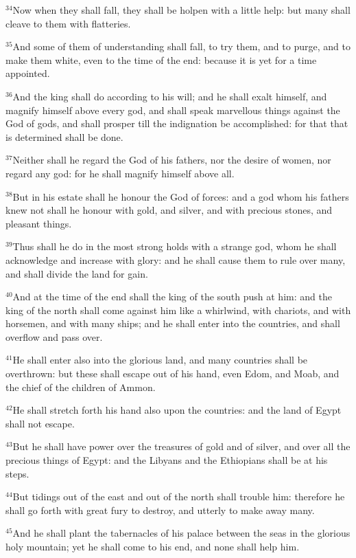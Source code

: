 \documentclass[12pt]{article}
\begin{document}
$^{34}$Now when they shall fall, they shall be holpen with a little
help: but many shall cleave to them with flatteries.


$^{35}$And some of them of understanding shall fall, to try them, and
to purge, and to make them white, even to the time of the end: because
it is yet for a time appointed.


$^{36}$And the king shall do according to his will; and he shall exalt
himself, and magnify himself above every god, and shall speak
marvellous things against the God of gods, and shall prosper till the
indignation be accomplished: for that that is determined shall be
done.


$^{37}$Neither shall he regard the God of his fathers, nor the desire
of women, nor regard any god: for he shall magnify himself above all.


$^{38}$But in his estate shall he honour the God of forces: and a god
whom his fathers knew not shall he honour with gold, and silver, and
with precious stones, and pleasant things.


$^{39}$Thus shall he do in the most strong holds with a strange god,
whom he shall acknowledge and increase with glory: and he shall cause
them to rule over many, and shall divide the land for gain.


$^{40}$And at the time of the end shall the king of the south push at
him: and the king of the north shall come against him like a
whirlwind, with chariots, and with horsemen, and with many ships; and
he shall enter into the countries, and shall overflow and pass over.


$^{41}$He shall enter also into the glorious land, and many countries
shall be overthrown: but these shall escape out of his hand, even
Edom, and Moab, and the chief of the children of Ammon.


$^{42}$He shall stretch forth his hand also upon the countries: and the
land of Egypt shall not escape.


$^{43}$But he shall have power over the treasures of gold and of
silver, and over all the precious things of Egypt: and the Libyans and
the Ethiopians shall be at his steps.


$^{44}$But tidings out of the east and out of the north shall trouble
him: therefore he shall go forth with great fury to destroy, and
utterly to make away many.


$^{45}$And he shall plant the tabernacles of his palace between the
seas in the glorious holy mountain; yet he shall come to his end, and
none shall help him.
\end{document}
